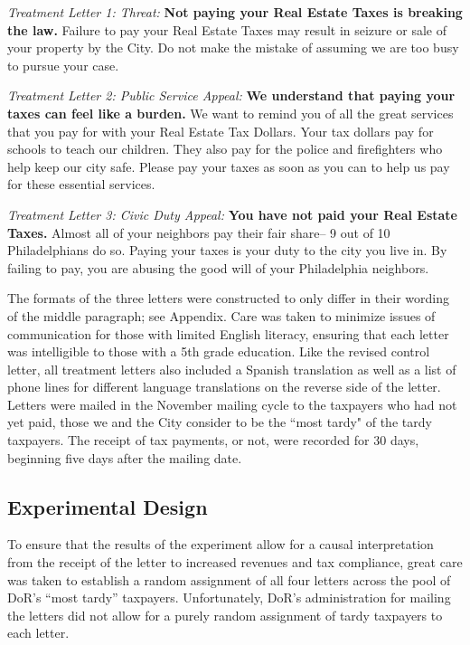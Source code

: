\documentclass[12pt,titlepage]{article}
\begin{document}
{\it Treatment Letter 1: Threat: } {\bf Not paying your Real Estate
  Taxes is breaking the law.} Failure to pay your Real Estate Taxes
may result in seizure or sale of your property by the City. Do not
make the mistake of assuming we are too busy to pursue your case.

{\it Treatment Letter 2: Public Service Appeal: } {\bf We understand that
  paying your taxes can feel like a burden.} We want to remind you of
all the great services that you pay for with your Real Estate Tax
Dollars. Your tax dollars pay for schools to teach our children.  They
also pay for the police and firefighters who help keep our city safe.
Please pay your taxes as soon as you can to help us pay for these
essential services.
  
{ \it Treatment Letter 3: Civic Duty Appeal: } {\bf You have not paid your
  Real Estate Taxes.}  Almost all of your neighbors pay their fair
share-- 9 out of 10 Philadelphians do so. Paying your taxes is your
duty to the city you live in. By failing to pay, you are abusing the
good will of your Philadelphia neighbors.

The formats of the three letters were constructed to only differ in
their wording of the middle paragraph; see Appendix.  Care was taken
to minimize issues of communication for those with limited English
literacy, ensuring that each letter was intelligible to those with a
5th grade education.  Like the revised control letter, all treatment
letters also included a Spanish translation as well as a list of phone
lines for different language translations on the reverse side of the
letter.  Letters were mailed in the November mailing cycle to the
taxpayers who had not yet paid, those we and the City consider to be
the ``most tardy" of the tardy taxpayers.  The receipt of tax payments,
or not, were recorded for 30 days, beginning five days after the
mailing date.


\subsection{Experimental Design}

To ensure that the results of the experiment allow for a causal
interpretation from the receipt of the letter to increased revenues and tax compliance,
great care was taken to establish a random assignment of all four
letters across the pool of DoR's ``most tardy'' taxpayers.
Unfortunately, DoR's administration for mailing the letters did not
allow for a purely random assignment of tardy taxpayers to each
letter.
\end{document}
